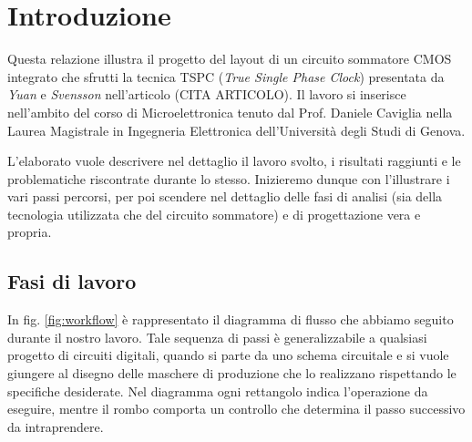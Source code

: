 
\chapter{Introduzione} %
\label{Chapter1} 


Questa relazione illustra il progetto del layout di un circuito sommatore CMOS integrato che sfrutti la tecnica TSPC (\textit{True Single Phase Clock}) presentata da \textit{Yuan} e \textit{Svensson} nell'articolo (CITA ARTICOLO). Il lavoro si inserisce nell'ambito del corso di Microelettronica tenuto dal Prof. Daniele Caviglia nella Laurea Magistrale in Ingegneria Elettronica dell'Università degli Studi di Genova.

L'elaborato vuole descrivere nel dettaglio il lavoro svolto, i risultati raggiunti e le problematiche riscontrate durante lo stesso. Inizieremo dunque con l'illustrare i vari passi percorsi, per poi scendere nel dettaglio delle fasi di analisi (sia della tecnologia utilizzata che del circuito sommatore) e di progettazione vera e propria.

\section{Fasi di lavoro}
\label{sec:sec_fasiLavoro}

In fig. \ref{fig:workflow} è rappresentato il diagramma di flusso che abbiamo seguito durante il nostro lavoro. Tale sequenza di passi è generalizzabile a qualsiasi progetto di circuiti digitali, quando si parte da uno schema circuitale e si vuole giungere al disegno delle maschere di produzione che lo realizzano rispettando le specifiche desiderate. Nel diagramma ogni rettangolo indica l'operazione da eseguire, mentre il rombo comporta un controllo che determina il passo successivo da intraprendere. 

